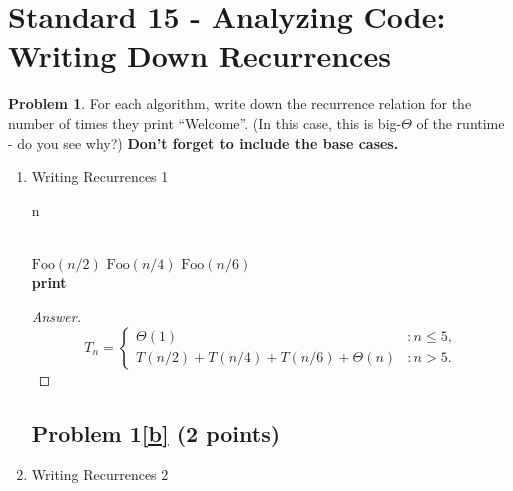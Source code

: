 \documentclass[11pt]{article}
\theoremstyle{definition}
\theoremstyle{definition}
\newtheorem{required}{Problem}
\theoremstyle{definition}
\begin{document}
\section{Standard 15 - Analyzing Code: Writing Down Recurrences}
\begin{required}
For each algorithm, write down the recurrence relation for the number of times they print ``Welcome''. (In this case, this is big-$\Theta$ of the runtime - do you see why?) \textbf{Don't forget to include the base cases.}
\begin{enumerate}[label=(\alph*)]
        \subsection{Problem 1\ref{a} (2 points)}
\item \label{a}

\begin{algorithm}
\caption{Writing Recurrences 1}\label{alg:Recurrence1}
\begin{algorithmic}[1]
\Return n
\EndIf

\noindent \\
\State $\text{Foo}(n/2)$
\State $\text{Foo}(n/4)$
\State $\text{Foo}(n/6)$ \\
    
    \State \textbf{print} 
\EndFor
\EndProcedure
\end{algorithmic}
\end{algorithm}

\begin{proof}[Answer]
\[
T_{n} = \begin{cases} \Theta(1)& : n \leq 5, \\
	T(n/2) + T(n/4) + T(n/6) + \Theta(n)& : n > 5.
\end{cases}
\]
\end{proof}

\newpage
\subsection{Problem 1\ref{b} (2 points)}
\item \label{b}

\begin{algorithm}
\caption{Writing Recurrences 2}\label{alg:Recurrence2}
\begin{algorithmic}[1]
\Return
\EndIf


\end{algorithmic}
\end{algorithm}
\end{enumerate}
\end{required}
\end{document}
